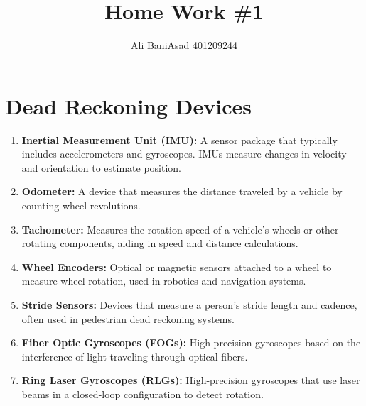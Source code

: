\documentclass{article}
\title{Home Work \#1}
\author{Ali BaniAsad 401209244}
\begin{document}
	\maketitle
	\section*{Dead Reckoning Devices}
\begin{enumerate}
    \item \textbf{Inertial Measurement Unit (IMU):} A sensor package that typically includes accelerometers and gyroscopes. IMUs measure changes in velocity and orientation to estimate position.
    
   
    \item \textbf{Odometer:} A device that measures the distance traveled by a vehicle by counting wheel revolutions.
    
    \item \textbf{Tachometer:} Measures the rotation speed of a vehicle's wheels or other rotating components, aiding in speed and distance calculations.
    
    \item \textbf{Wheel Encoders:} Optical or magnetic sensors attached to a wheel to measure wheel rotation, used in robotics and navigation systems.
    
    \item \textbf{Stride Sensors:} Devices that measure a person's stride length and cadence, often used in pedestrian dead reckoning systems.
    
    \item \textbf{Fiber Optic Gyroscopes (FOGs):} High-precision gyroscopes based on the interference of light traveling through optical fibers.
    
    \item \textbf{Ring Laser Gyroscopes (RLGs):} High-precision gyroscopes that use laser beams in a closed-loop configuration to detect rotation.
\end{enumerate}
\end{document}
